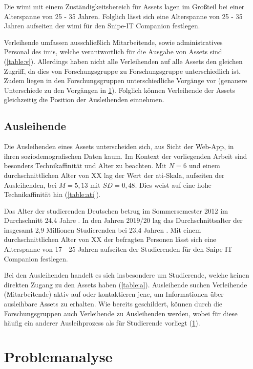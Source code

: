 Die \ac{wimi} mit einem Zuständigkeitsbereich für Assets lagen im Großteil bei einer
Alterspanne von 25 - 35 Jahren. Folglich lässt sich eine Alterspanne von 25 - 35 Jahren aufseiten
der \ac{wimi} für den Snipe-IT Companion festlegen.

Verleihende umfassen ausschließlich Mitarbeitende, sowie administratives Personal des \ac{imis},
welche verantwortlich für die Ausgabe von Assets sind (\ref{table:v}). Allerdings haben nicht alle
Verleihenden auf alle Assets den gleichen Zugriff, da dies von Forschungsgruppe zu Forschungsgruppe
unterschiedlich ist. Zudem liegen in den Forschungsgruppen unterschiedliche Vorgänge vor (genauere
Unterschiede zu den Vorgängen in \ref{section:iststand}). Folglich können Verleihende der Assets
gleichzeitig die Position der Ausleihenden einnehmen.

\subsection{Ausleihende}
Die Ausleihenden eines Assets unterscheiden sich, aus Sicht der Web-App, in ihren
soziodemografischen Daten kaum. Im Kontext der vorliegenden Arbeit sind besonders Technikaffinität
und Alter zu beachten.
Mit $N=6$ und einem durchschnittlichen Alter von XX lag der Wert der \ac{ati}-Skala, aufseiten der
Ausleihenden, bei $M=5,13$ mit $SD=0,48$. Dies weist auf eine hohe Technikaffinität hin
(\ref{table:ati}).

Das Alter der studierenden Deutschen betrug im Sommersemester 2012 im Durchschnitt 24,4 Jahre
\cite{middendorff2017wirtschaftliche}. In den Jahren 2019/20 lag das Durchschnittsalter der
insgesamt 2,9 Millionen Studierenden bei 23,4 Jahren \cite{noauthor_studierende_nodate}. Mit einem
durchschnittlichen Alter von XX der befragten Personen lässt sich eine Alterspanne von 17 - 25
Jahren aufseiten der Studierenden für den Snipe-IT Companion festlegen.

Bei den Ausleihenden handelt es sich insbesondere um Studierende, welche keinen direkten Zugang zu
den Assets haben (\ref{table:a}). Ausleihende suchen Verleihende (Mitarbeitende) aktiv auf oder
kontaktieren jene, um Informationen über ausleihbare Assets zu erhalten. Wie bereits geschildert,
können durch die Forschungsgruppen auch Verleihende zu Ausleihenden werden, wobei
für diese häufig ein anderer Ausleihprozess als für Studierende vorliegt (\ref{section:iststand}).


\section{Problemanalyse}
\label{section:iststand}

